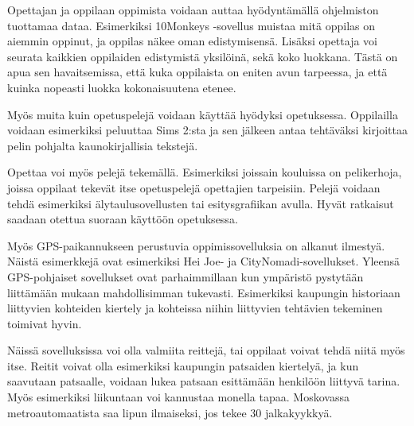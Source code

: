 \documentclass[utf8,bachelor]{gradu3}
\begin{document}
Opettajan ja oppilaan oppimista voidaan auttaa hyödyntämällä ohjelmiston tuottamaa dataa. Esimerkiksi 10Monkeys -sovellus muistaa mitä oppilas on aiemmin oppinut, ja oppilas näkee oman edistymisensä. Lisäksi opettaja voi seurata kaikkien oppilaiden edistymistä yksilöinä, sekä koko luokkana. Tästä on apua sen havaitsemissa, että kuka oppilaista on eniten avun tarpeessa, ja että kuinka nopeasti luokka kokonaisuutena etenee.

Myös muita kuin opetuspelejä voidaan käyttää hyödyksi opetuksessa. Oppilailla voidaan esimerkiksi peluuttaa Sims 2:sta ja sen jälkeen antaa tehtäväksi kirjoittaa pelin pohjalta kaunokirjallisia tekstejä. \parencite[][41-43]{laatua}

Opettaa voi myös pelejä tekemällä. Esimerkiksi joissain kouluissa on pelikerhoja, joissa oppilaat tekevät itse opetuspelejä opettajien tarpeisiin. Pelejä voidaan tehdä esimerkiksi älytaulusovellusten tai esitysgrafiikan avulla. Hyvät ratkaisut saadaan otettua suoraan käyttöön opetuksessa. \parencite[][]{peleja}

Myös GPS-paikannukseen perustuvia oppimissovelluksia on alkanut ilmestyä. Näistä esimerkkejä ovat esimerkiksi Hei Joe- ja CityNomadi-sovellukset. Yleensä GPS-pohjaiset sovellukset ovat parhaimmillaan kun ympäristö pystytään liittämään mukaan mahdollisimman tukevasti. Esimerkiksi kaupungin historiaan liittyvien kohteiden kiertely ja kohteissa niihin liittyvien tehtävien tekeminen toimivat hyvin. \parencite[][]{heijoe}

Näissä sovelluksissa voi olla valmiita reittejä, tai oppilaat voivat tehdä niitä myös itse. Reitit voivat olla esimerkiksi kaupungin patsaiden kiertelyä, ja kun saavutaan patsaalle, voidaan lukea patsaan esittämään henkilöön liittyvä tarina. Myös esimerkiksi liikuntaan voi kannustaa monella tapaa. Moskovassa metroautomaatista saa lipun ilmaiseksi, jos tekee 30 jalkakyykkyä. \parencite[][]{kyykky}
\end{document}
